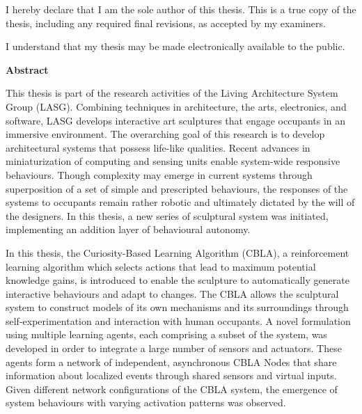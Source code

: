 \cleardoublepage %
 


  \noindent
I hereby declare that I am the sole author of this thesis. This is a true copy of the thesis, including any required final revisions, as accepted by my examiners.

  \bigskip
  
  \noindent
I understand that my thesis may be made electronically available to the public.

\cleardoublepage


\begin{center}\textbf{Abstract}\end{center}

This thesis is part of the research activities of the Living Architecture System Group (LASG). Combining techniques in architecture, the arts, electronics, and software, LASG develops interactive art sculptures that engage occupants in an immersive environment. The overarching goal of this research is to develop architectural systems that possess life-like qualities. Recent advances in miniaturization of computing and sensing units enable system-wide responsive behaviours. Though complexity may emerge in current systems through superposition of a set of simple and prescripted behaviours, the responses of the systems to occupants remain rather robotic and ultimately dictated by the will of the designers. In this thesis, a new series of sculptural system was initiated, implementing an addition layer of behavioural autonomy.  

In this thesis, the Curiosity-Based Learning Algorithm (CBLA), a reinforcement learning algorithm which selects actions that lead to maximum potential knowledge gains, is introduced to enable the sculpture to automatically generate interactive behaviours and adapt to changes. The CBLA allows the sculptural system to construct models of its own mechanisms and its surroundings through self-experimentation and interaction with human occupants. A novel formulation using multiple learning agents, each comprising a subset of the system, was developed in order to integrate a large number of sensors and actuators. These agents form a network of independent, asynchronous CBLA Nodes that share information about localized events through shared sensors and virtual inputs. Given different network configurations of the CBLA system, the emergence of system behaviours with varying activation patterns was observed. 

